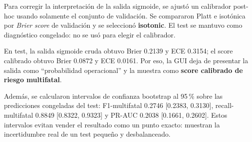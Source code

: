 Para corregir la interpretación de la salida sigmoide, se ajustó un calibrador post-hoc usando solamente el conjunto de validación. Se compararon Platt e isotónica por \emph{Brier score} de validación y se seleccionó \textbf{isotonic}. El test se mantuvo como diagnóstico congelado: no se usó para elegir el calibrador.

En test, la salida sigmoide cruda obtuvo Brier 0.2139 y ECE 0.3154; el score calibrado obtuvo Brier 0.0872 y ECE 0.0161. Por eso, la GUI deja de presentar la salida como ``probabilidad operacional'' y la muestra como \textbf{score calibrado de riesgo multifatal}.

Además, se calcularon intervalos de confianza bootstrap al 95\,\% sobre las predicciones congeladas del test: F1-multifatal 0.2746 [0.2383, 0.3130], recall-multifatal 0.8849 [0.8322, 0.9323] y PR-AUC 0.2038 [0.1661, 0.2602]. Estos intervalos evitan vender el resultado como un punto exacto: muestran la incertidumbre real de un test pequeño y desbalanceado.
